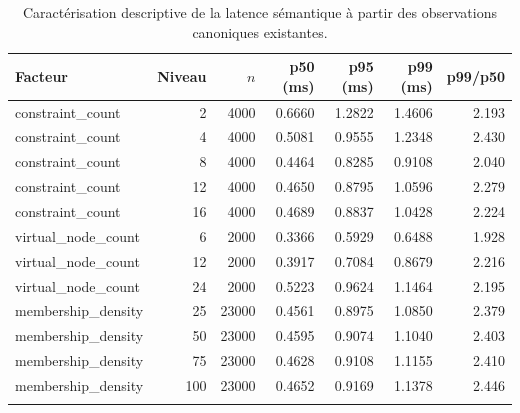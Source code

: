 \begin{table}[!t]
\centering
\caption{Caractérisation descriptive de la latence sémantique à partir des observations canoniques existantes.}
\label{tab:v4-semantic-latency}
\scriptsize
\begin{tabular}{@{}lrrrrrr@{}}
\toprule
Facteur & Niveau & $n$ & p50 (ms) & p95 (ms) & p99 (ms) & p99/p50 \\
\midrule
constraint\_count & 2 & 4000 & 0.6660 & 1.2822 & 1.4606 & 2.193 \\
constraint\_count & 4 & 4000 & 0.5081 & 0.9555 & 1.2348 & 2.430 \\
constraint\_count & 8 & 4000 & 0.4464 & 0.8285 & 0.9108 & 2.040 \\
constraint\_count & 12 & 4000 & 0.4650 & 0.8795 & 1.0596 & 2.279 \\
constraint\_count & 16 & 4000 & 0.4689 & 0.8837 & 1.0428 & 2.224 \\
\addlinespace
virtual\_node\_count & 6 & 2000 & 0.3366 & 0.5929 & 0.6488 & 1.928 \\
virtual\_node\_count & 12 & 2000 & 0.3917 & 0.7084 & 0.8679 & 2.216 \\
virtual\_node\_count & 24 & 2000 & 0.5223 & 0.9624 & 1.1464 & 2.195 \\
\addlinespace
membership\_density & 25 & 23000 & 0.4561 & 0.8975 & 1.0850 & 2.379 \\
membership\_density & 50 & 23000 & 0.4595 & 0.9074 & 1.1040 & 2.403 \\
membership\_density & 75 & 23000 & 0.4628 & 0.9108 & 1.1155 & 2.410 \\
membership\_density & 100 & 23000 & 0.4652 & 0.9169 & 1.1378 & 2.446 \\
\addlinespace
\bottomrule
\end{tabular}
\normalsize
\end{table}
